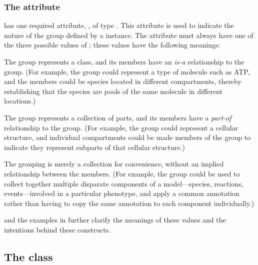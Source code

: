\subsubsection{The \fixttspace{} attribute}
\label{kind-attribute}

\Group has one required attribute, , of type .  This attribute is used to indicate the nature of the group defined by a \Group instance.  The  attribute must always have one of the three possible values of ; these values have the following meanings:

\begin{description}[font=\normalfont\ttfamily\color{black},style=nextline]

\item[\token{classification}] The group represents a class, and its members have an \emph{is-a} relationship to the group.  (For example, the group could represent a type of molecule such as ATP, and the members could be species located in different compartments, thereby establishing that the species are pools of the same molecule in different locations.)

\item[\token{partonomy}] The group represents a collection of parts, and its members have a \emph{part-of} relationship to the group.  (For example, the group could represent a cellular structure, and individual compartments could be made members of the group to indicate they represent subparts of that cellular structure.)

\item[\token{collection}] The grouping is merely a collection for convenience, without an implied relationship between the members.  (For example, the group could be used to collect together multiple disparate components of a model---species, reactions, events---involved in a particular phenotype, and apply a common annotation rather than having to copy the same annotation to each component individually.)

\end{description}

 and the examples in  further clarify the meanings of these values and the intentions behind these constructs.


\subsection{The  class}
\label{member-class}

